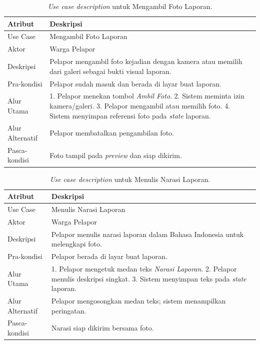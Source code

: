 \begin{table}[htbp]
\centering
\caption{\textit{Use case description} untuk Mengambil Foto Laporan.}
\label{tab:uc-foto}
\begin{tabular}{p{3.5cm} p{9cm}}
\toprule
\textbf{Atribut} & \textbf{Deskripsi} \\
\midrule
Use Case & Mengambil Foto Laporan \\
Aktor & Warga Pelapor \\
Deskripsi & Pelapor mengambil foto kejadian dengan kamera atau memilih dari galeri sebagai bukti visual laporan. \\
Pra-kondisi & Pelapor sudah masuk dan berada di layar buat laporan. \\
Alur Utama & 1. Pelapor menekan tombol \textit{Ambil Foto}. 2. Sistem meminta izin kamera/galeri. 3. Pelapor mengambil atau memilih foto. 4. Sistem menyimpan referensi foto pada \textit{state} laporan. \\
Alur Alternatif & Pelapor membatalkan pengambilan foto. \\
Pasca-kondisi & Foto tampil pada \textit{preview} dan siap dikirim. \\
\bottomrule
\end{tabular}
\end{table}

\begin{table}[htbp]
\centering
\caption{\textit{Use case description} untuk Menulis Narasi Laporan.}
\label{tab:uc-narasi}
\begin{tabular}{p{3.5cm} p{9cm}}
\toprule
\textbf{Atribut} & \textbf{Deskripsi} \\
\midrule
Use Case & Menulis Narasi Laporan \\
Aktor & Warga Pelapor \\
Deskripsi & Pelapor menulis narasi laporan dalam Bahasa Indonesia untuk melengkapi foto. \\
Pra-kondisi & Pelapor berada di layar buat laporan. \\
Alur Utama & 1. Pelapor mengetuk medan teks \textit{Narasi Laporan}. 2. Pelapor menulis deskripsi singkat. 3. Sistem menyimpan teks pada \textit{state} laporan. \\
Alur Alternatif & Pelapor mengosongkan medan teks; sistem menampilkan peringatan. \\
Pasca-kondisi & Narasi siap dikirim bersama foto. \\
\bottomrule
\end{tabular}
\end{table}

